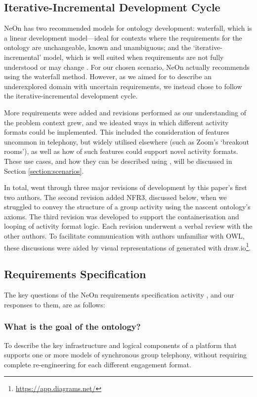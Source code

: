 \subsection{Iterative-Incremental Development Cycle}

NeOn has two recommended models for ontology development: waterfall, which is a linear development model---ideal for contexts where the requirements for the ontology are unchangeable, known and unambiguous; and the `iterative-incremental' model, which is well suited when requirements are not fully understood or may change \cite{suarez2012}.
For our chosen scenario, NeOn actually recommends using the waterfall method. However, as we aimed for \ONT{} to describe an underexplored domain with uncertain requirements, we instead chose to follow the iterative-incremental development cycle.

More requirements were added and revisions performed as our understanding of the problem context grew, and we ideated ways in which different activity formats could be implemented. This included the consideration of features uncommon in telephony, but widely utilised elsewhere (such as Zoom's `breakout rooms'), as well as how of such features could support novel activity formats. These use cases, and how they can be described using \ONT{}, will be discussed in Section \ref{section:scenarios}.

In total, \ONT{} went through three major revisions of development by this paper's first two authors. The second revision added NFR3, discussed below, when we struggled to convey the structure of a group activity using the nascent ontology's axioms. The third revision was developed to support the containerisation and looping of activity format logic. Each revision underwent a verbal review with the other authors. To facilitate communication with authors unfamiliar with OWL, these discussions were aided by visual representations of \ONT{} generated with draw.io\footnote{\url{https://app.diagrams.net/}}.

\subsection{Requirements Specification}
The key questions of the NeOn requirements specification activity \cite{suarez2012_requirements}, and our responses to them, are as follows: 

\subsubsection{What is the goal of the ontology?}
To describe the key infrastructure and logical components of a platform that supports one or more models of synchronous group telephony, without requiring complete re-engineering for each different engagement format.

